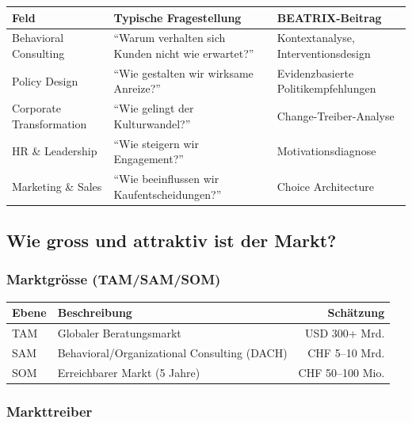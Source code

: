 \documentclass[11pt,a4paper]{article}
\begin{document}
\begin{table}[h]
\centering
\begin{tabularx}{\textwidth}{lXX}
\toprule
\textbf{Feld} & \textbf{Typische Fragestellung} & \textbf{BEATRIX-Beitrag} \\
\midrule
Behavioral Consulting & ``Warum verhalten sich Kunden nicht wie erwartet?'' & Kontextanalyse, Interventionsdesign \\
Policy Design & ``Wie gestalten wir wirksame Anreize?'' & Evidenzbasierte Politikempfehlungen \\
Corporate Transformation & ``Wie gelingt der Kulturwandel?'' & Change-Treiber-Analyse \\
HR \& Leadership & ``Wie steigern wir Engagement?'' & Motivationsdiagnose \\
Marketing \& Sales & ``Wie beeinflussen wir Kaufentscheidungen?'' & Choice Architecture \\
\bottomrule
\end{tabularx}
\end{table}

\subsection{Wie gross und attraktiv ist der Markt?}

\subsubsection{Marktgrösse (TAM/SAM/SOM)}

\begin{table}[h]
\centering
\begin{tabularx}{\textwidth}{lXr}
\toprule
\textbf{Ebene} & \textbf{Beschreibung} & \textbf{Schätzung} \\
\midrule
TAM & Globaler Beratungsmarkt & USD 300+ Mrd. \\
SAM & Behavioral/Organizational Consulting (DACH) & CHF 5--10 Mrd. \\
SOM & Erreichbarer Markt (5 Jahre) & CHF 50--100 Mio. \\
\bottomrule
\end{tabularx}
\end{table}

\subsubsection{Markttreiber}
\end{document}

